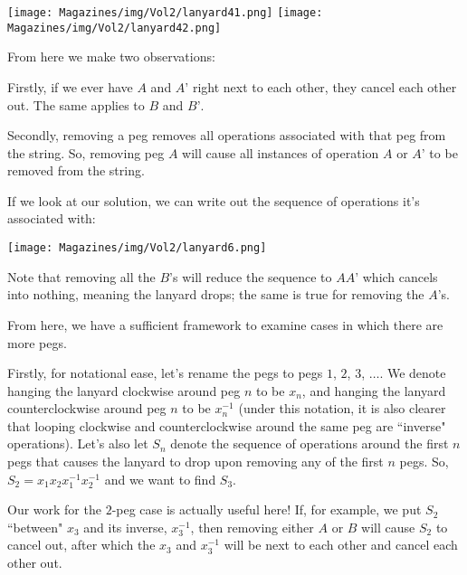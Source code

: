 \documentclass{article}
\begin{document}
\begin{multicols}{3}
\begin{center}
    \texttt{[image: Magazines/img/Vol2/lanyard41.png]}
    \texttt{[image: Magazines/img/Vol2/lanyard42.png]}
\end{center}

From here we make two observations:

Firstly, if we ever have $A$ and $A’$ right next to each other, they cancel each other out. The same applies to $B$ and $B’$.


Secondly, removing a peg removes all operations associated with that peg from the string. So, removing peg $A$ will cause all instances of operation $A$ or $A’$ to be removed from the string. 

If we look at our solution, we can write out the sequence of operations it’s associated with: 

\begin{center}
    \texttt{[image: Magazines/img/Vol2/lanyard6.png]}
\end{center}

Note that removing all the $B$’s will reduce the sequence to $AA’$ which cancels into nothing, meaning the lanyard drops; the same is true for removing the $A$’s.

From here, we have a sufficient framework to examine cases in which there are more pegs.

Firstly, for notational ease, let's rename the pegs to pegs $1$, $2$, $3$, $\dots$. We denote hanging the lanyard clockwise around peg $n$ to be $x_n$, and hanging the lanyard counterclockwise around peg $n$ to be $x_n^{-1}$ (under this notation, it is also clearer that looping clockwise and counterclockwise around the same peg are ``inverse" operations). Let's also let $S_n$ denote the sequence of operations around the first $n$ pegs that causes the lanyard to drop upon removing any of the first $n$ pegs. So, $S_2=x_1x_2x_1^{-1}x_2^{-1}$ and we want to find $S_3$.

Our work for the $2$-peg case is actually useful here! If, for example, we put $S_2$ ``between" $x_3$ and its inverse, $x_3^{-1}$, then removing either $A$ or $B$ will cause $S_2$ to cancel out, after which the $x_3$ and $x_3^{-1}$ will be next to each other and cancel each other out.


\end{multicols}
\end{document}
